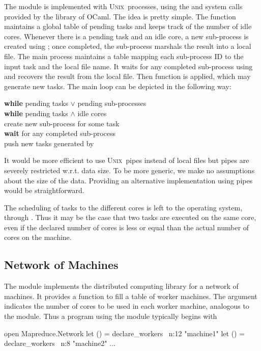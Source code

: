 \documentclass[preprint]{sigplanconf}
\newcommand{\Ocaml}{OCaml}
\newcommand{\unix}{\textsc{Unix}}
\begin{document}
The  module is implemented with \unix\ processes, using the
 and  system calls provided by the  library
of \Ocaml. The idea is pretty simple.  The  function
maintains a global table of pending tasks and keeps track of the
number of idle cores.  Whenever there is a pending task and an idle
core, a new sub-process is created using ; once
completed, the sub-process marshals the result into a local file. The
main process maintains a table mapping each sub-process ID to the
input task and the local file name. It waits for any completed
sub-process using  and recovers the result from the
local file. Then function  is applied, which may generate
new tasks.  The main loop can be depicted in the following way:
\begin{flushleft}
  \quad  \textbf{while} pending tasks $\lor$ pending sub-processes \\
  \quad  \quad \textbf{while} pending tasks $\land$ idle cores \\
  \quad  \quad \quad create new sub-process for some task \\
  \quad  \quad \textbf{wait} for any completed sub-process \\
  \quad  \quad \quad push new tasks generated by  \\
\end{flushleft}

It would be more efficient to use \unix\ pipes instead of local files
but pipes are severely restricted w.r.t. data size. To be more
generic, we make no assumptions about the size of the data. Providing
an alternative implementation using pipes would be straightforward.

The scheduling of tasks to the different cores is left to the
operating system, through . Thus it may be the case that
two tasks are executed on the same core, even if the declared number
of cores is less or equal than the actual number of cores on the machine.

\subsection{Network of Machines}

The  module implements the distributed computing library
for a network of machines.  It provides a function
 to fill a table of
worker machines. The argument  indicates the number of cores to
be used in each worker machine, analogous to the 
module. Thus a program using the  module typically begins
with
\begin{ocaml}
open Mapreduce.Network
let () = declare_workers ~n:12 "machine1"
let () = declare_workers ~n:8  "machine2"
...
\end{ocaml}
\end{document}
